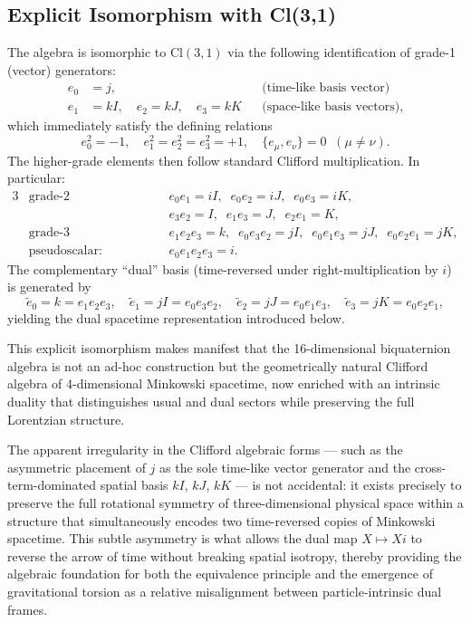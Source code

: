 \documentclass[dvipdfmx,a4paper]{article}
\begin{document}
\subsection{Explicit Isomorphism with Cl(3,1)}

The algebra is isomorphic to $\mathrm{Cl}(3,1)$ via the following identification of grade-1 (vector) generators:
\begin{align*}
  e_0 &= j,                    & &\text{(time-like basis vector)}\\[4pt]
  e_1 &= kI, \quad e_2 = kJ, \quad e_3 = kK & &\text{(space-like basis vectors)},
\end{align*}
which immediately satisfy the defining relations
\[
e_0^2 = -1, \quad e_1^2 = e_2^2 = e_3^2 = +1, \quad \{e_\mu,e_\nu\} = 0 \;\; (\mu \neq \nu).
\]
The higher-grade elements then follow standard Clifford multiplication. In particular:
\begin{alignat*}{3}
  &\text{grade-2 (bivectors):}  &\quad& e_0e_1 = iI, \;\; e_0e_2 = iJ, \;\; e_0e_3 = iK, \\
  &&& e_3e_2 = I,   \;\; e_1e_3 = J,   \;\; e_2e_1 = K, \\[6pt]
  &\text{grade-3 (trivectors):} && e_1e_2e_3 = k, \;\; e_0e_3e_2 = jI, \;\; e_0e_1e_3 = jJ, \;\; e_0e_2e_1 = jK, \\[6pt]
  &\text{pseudoscalar:}        && e_0e_1e_2e_3 = i.
\end{alignat*}
The complementary ``dual'' basis (time-reversed under right-multiplication by $i$) is generated by
\[
\tilde{e}_0 = k = e_1e_2e_3, \quad \tilde{e}_1 = jI = e_0e_3e_2, \quad \tilde{e}_2 = jJ = e_0e_1e_3, \quad \tilde{e}_3 = jK = e_0e_2e_1,
\]
yielding the dual spacetime representation introduced below.

This explicit isomorphism makes manifest that the 16-dimensional biquaternion algebra is not an ad-hoc construction but the geometrically natural Clifford algebra of 4-dimensional Minkowski spacetime, now enriched with an intrinsic duality that distinguishes usual and dual sectors while preserving the full Lorentzian structure. 

The apparent irregularity in the Clifford algebraic forms — such as the asymmetric placement of $j$ as the sole time-like vector generator and the cross-term-dominated spatial basis $kI$, $kJ$, $kK$ — is not accidental: it exists precisely to preserve the full rotational symmetry of three-dimensional physical space within a structure that simultaneously encodes two time-reversed copies of Minkowski spacetime. This subtle asymmetry is what allows the dual map $X \mapsto Xi$ to reverse the arrow of time without breaking spatial isotropy, thereby providing the algebraic foundation for both the equivalence principle and the emergence of gravitational torsion as a relative misalignment between particle-intrinsic dual frames.
\end{document}
